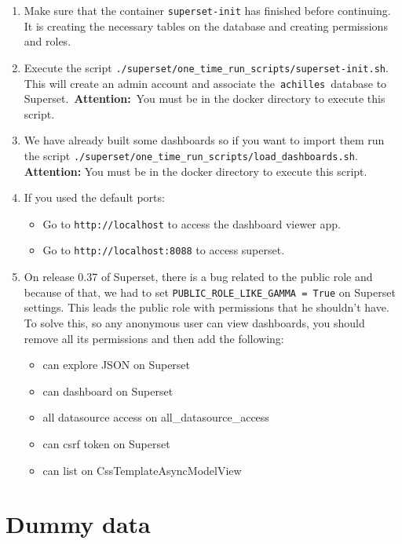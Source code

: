 \documentclass[
]{book}
\providecommand{\tightlist}{%
  \setlength{\itemsep}{0pt}\setlength{\parskip}{0pt}}
\begin{document}
\begin{enumerate}
\def\labelenumi{\arabic{enumi}.}
\item
  Make sure that the container \texttt{superset-init} has finished before continuing. It is creating the necessary tables on the database and creating permissions and roles.
\item
  Execute the script \texttt{./superset/one\_time\_run\_scripts/superset-init.sh}. This will create an admin account and associate the~\texttt{achilles}~database to Superset.~\textbf{Attention:}~You must be in the docker directory to execute this script.
\item
  We have already built some dashboards so if you want to import them run the script \texttt{./superset/one\_time\_run\_scripts/load\_dashboards.sh}. \textbf{Attention:} You must be in the docker directory to execute this script.
\item
  If you used the default ports:

  \begin{itemize}
  \tightlist
  \item
    Go to \texttt{http://localhost} to access the dashboard viewer app.
  \item
    Go to \texttt{http://localhost:8088} to access superset.
  \end{itemize}
\item
  On release 0.37 of Superset, there is a bug related to the public role and because of that, we had to set \texttt{PUBLIC\_ROLE\_LIKE\_GAMMA\ =\ True} on Superset settings. This leads the public role with permissions that he shouldn't have. To solve this, so any anonymous user can view dashboards, you should remove all its permissions and then add the following:

  \begin{itemize}
  \tightlist
  \item
    can explore JSON on Superset
  \item
    can dashboard on Superset
  \item
    all datasource access on all\_datasource\_access
  \item
    can csrf token on Superset
  \item
    can list on CssTemplateAsyncModelView
  \end{itemize}
\end{enumerate}

\hypertarget{dummy-data}{%
\section{Dummy data}\label{dummy-data}}
\end{document}
